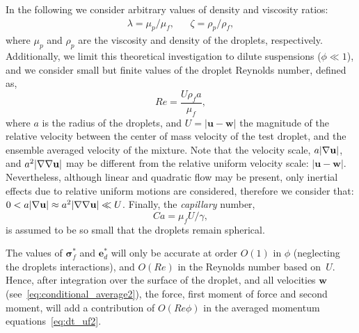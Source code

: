 In the following we consider arbitrary values of density and viscosity ratios: 
\begin{align}
    \lambda = \mu_p/\mu_f,  && \zeta =\rho_p /\rho_f,
\end{align}
where $\mu_p$ and $\rho_p$ are the viscosity and density of the droplets, respectively.
Additionally, we limit this theoretical investigation to dilute suspensions ($\phi\ll 1$), and we consider small but finite values of the droplet Reynolds number, defined as,
\begin{equation}
    Re  = \frac{U\rho_f a}{\mu_f}, 
\end{equation}
where $a$ is the radius of the droplets, and $U = |\textbf{u} - \textbf{w}|$ the magnitude of the relative velocity between the center of mass velocity of the test droplet, and the ensemble averaged velocity of the mixture. 
Note that the velocity scale, $a |\mathbf{\nabla} \textbf{u}|$, and $a^2 |\mathbf{\nabla}\mathbf{\nabla} \textbf{u}|$ may be different from the relative uniform velocity scale: $|\textbf{u} - \textbf{w}|$. 
Nevertheless, although linear and quadratic flow may be present, only inertial effects due to relative uniform motions are considered, therefore we consider that: $0 < a |\mathbf{\nabla} \textbf{u}|\approx a^2 |\mathbf{\nabla}\mathbf{\nabla} \textbf{u}| \ll U$. 
Finally, the \textit{capillary} number,
\begin{equation}
    Ca = \mu_f U/\gamma,
\end{equation}
is assumed to be so small that the droplets remain spherical. 


The values of $\bm\sigma_f^*$ and $\textbf{e}_d^*$ will only be accurate at order $O(1)$ in $\phi$ (neglecting the droplets interactions), and $O(Re)$ in the Reynolds number based on~$U$. 
Hence, after integration over the surface of the droplet, and all velocities $\textbf{w}$ (see~\ref{eq:conditional_average2}), the force, first moment of force and second moment, will add a contribution of $O(Re \phi)$ in the averaged momentum equations~\eqref{eq:dt_uf2}. 


